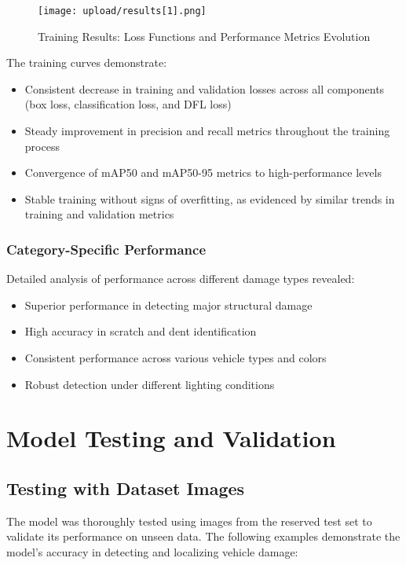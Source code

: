 \documentclass[12pt,a4paper]{report}
\begin{document}
\begin{figure}[H]
    \centering
    \texttt{[image: upload/results[1].png]}
    \caption{Training Results: Loss Functions and Performance Metrics Evolution}
    \label{fig:training_results}
\end{figure}

The training curves demonstrate:
\begin{itemize}
    \item Consistent decrease in training and validation losses across all components (box loss, classification loss, and DFL loss)
    \item Steady improvement in precision and recall metrics throughout the training process
    \item Convergence of mAP50 and mAP50-95 metrics to high-performance levels
    \item Stable training without signs of overfitting, as evidenced by similar trends in training and validation metrics
\end{itemize}

\subsubsection{Category-Specific Performance}
Detailed analysis of performance across different damage types revealed:
\begin{itemize}
    \item Superior performance in detecting major structural damage
    \item High accuracy in scratch and dent identification
    \item Consistent performance across various vehicle types and colors
    \item Robust detection under different lighting conditions
\end{itemize}

\section{Model Testing and Validation}

\subsection{Testing with Dataset Images}

The model was thoroughly tested using images from the reserved test set to validate its performance on unseen data. The following examples demonstrate the model's accuracy in detecting and localizing vehicle damage:
\end{document}
